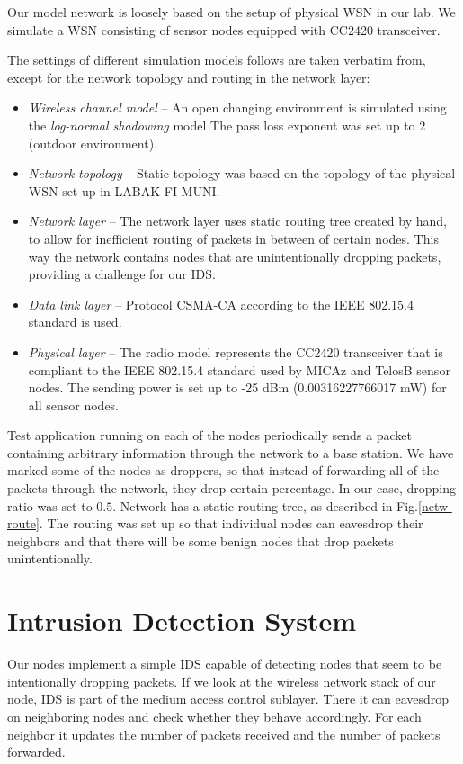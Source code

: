 \documentclass[12pt,oneside]{fithesis2}
\begin{document}
Our model network is loosely based on the setup of physical WSN in our lab. We simulate a WSN consisting of sensor nodes equipped with CC2420 transceiver.

The settings of different simulation models follows are taken verbatim from\cite{stehl2013opt}, except for the network topology and routing in the network layer:
\begin{itemize}
\item \textit{Wireless channel model} -- An open changing environment is simulated using the \textit{log-normal shadowing} model \cite{R01}  The pass loss exponent was set up to $2$ (outdoor environment). 

\item \textit{Network topology } -- Static topology was based on the topology of the physical WSN set up in LABAK FI MUNI.

\item \textit{Network layer} -- The network layer uses static routing tree created by hand, to allow for inefficient routing of packets in between of certain nodes. This way the network contains nodes that are unintentionally dropping packets, providing a challenge for our IDS.

\item \textit{Data link layer} -- Protocol CSMA-CA according to the IEEE 802.15.4 standard is used.

\item \textit{Physical layer} -- The radio model represents the CC2420 transceiver that is compliant to the IEEE 802.15.4 standard used by MICAz and TelosB sensor nodes. The sending power is set up to -25 dBm (0.00316227766017 mW) for all sensor nodes.
\end{itemize}

Test application running on each of the nodes periodically sends a packet containing arbitrary information through the network to a base station. 
We have marked some of the nodes as droppers, so that instead of forwarding all of the packets through the network, they drop certain percentage. In our case, dropping ratio was set to $0.5$. Network has a static routing tree, as described in Fig.\ref{netw-route}. The routing was set up so that individual nodes can eavesdrop their neighbors and that there will be some benign nodes that drop packets unintentionally.

\section{Intrusion Detection System}
Our nodes implement a simple IDS capable of detecting nodes that seem to be intentionally dropping packets.
If we look at the wireless network stack of our node, IDS is part of the medium access control sublayer.
There it can eavesdrop on neighboring nodes and check whether they behave accordingly.
For each neighbor it updates the number of packets received and the number of packets forwarded.
\end{document}

